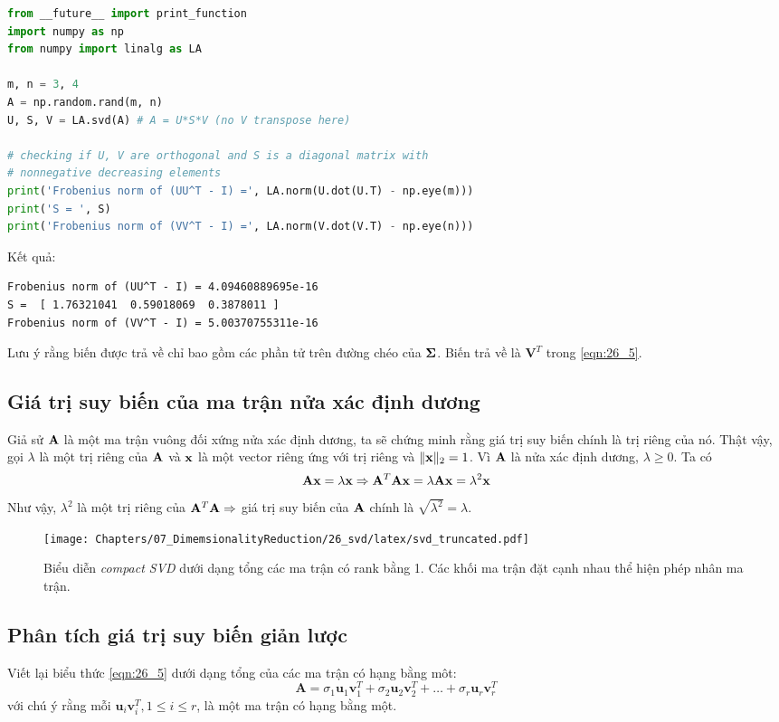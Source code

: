 \begin{lstlisting}[language=Python]
from __future__ import print_function
import numpy as np
from numpy import linalg as LA

m, n = 3, 4
A = np.random.rand(m, n)
U, S, V = LA.svd(A) # A = U*S*V (no V transpose here)

# checking if U, V are orthogonal and S is a diagonal matrix with
# nonnegative decreasing elements
print('Frobenius norm of (UU^T - I) =', LA.norm(U.dot(U.T) - np.eye(m)))
print('S = ', S)
print('Frobenius norm of (VV^T - I) =', LA.norm(V.dot(V.T) - np.eye(n)))
\end{lstlisting}
\newpage
Kết quả:
\begin{lstlisting}
Frobenius norm of (UU^T - I) = 4.09460889695e-16
S =  [ 1.76321041  0.59018069  0.3878011 ]
Frobenius norm of (VV^T - I) = 5.00370755311e-16
\end{lstlisting}

Lưu ý rằng biến  được trả về chỉ bao gồm các phần tử trên đường
chéo của $\mathbf{\Sigma}$. Biến  trả về là $\mathbf{V}^T$ trong
\eqref{eqn:26_5}.

\subsection{Giá trị suy biến của ma trận nửa xác định dương}
Giả sử $\mathbf{A}$ là một ma trận vuông đối xứng nửa xác định dương, ta sẽ chứng minh rằng giá trị suy biến  chính là trị riêng của nó. Thật vậy, gọi $\lambda$ là một trị riêng của $\mathbf{A}$ và $\mathbf{x}$ là một vector riêng ứng với trị riêng và $\|\mathbf{x}\|_2 = 1$. Vì $\mathbf{A}$ là nửa xác định dương, $\lambda \geq 0$.
Ta có
\begin{equation}
\mathbf{A}\mathbf{x} = \lambda\mathbf{x} \Rightarrow \mathbf{A}^T\mathbf{A}\mathbf{x} = \lambda\mathbf{A}\mathbf{x} = \lambda^2\mathbf{x}
\end{equation}
Như vậy, $\lambda^2$ là một trị riêng của $\mathbf{A}^T\mathbf{A} \Rightarrow$ giá trị suy biến của $\mathbf{A}$ chính là $\sqrt{\lambda^2} = \lambda$.

\begin{figure}[t]
\centering
\texttt{[image: Chapters/07\_DimemsionalityReduction/26\_svd/latex/svd\_truncated.pdf]}
\caption[]{Biểu diễn \textit{compact SVD} dưới dạng tổng
các ma trận có rank bằng 1. Các khối ma trận đặt cạnh nhau thể hiện phép
nhân ma trận.}
\label{fig:26_2}
\end{figure}


\subsection{Phân tích giá trị suy biến giản lược}
Viết lại biểu thức \eqref{eqn:26_5} dưới dạng tổng của các ma trận có hạng
bằng môt:
\begin{equation}
\mathbf{A} = \sigma_1 \mathbf{u}_1 \mathbf{v}^T_1 + \sigma_2\mathbf{u}_2\mathbf{v}_2^T + \dots + \sigma_r\mathbf{u}_r\mathbf{v}_r^T
\end{equation}
với chú ý rằng mỗi $\mathbf{u}_i\mathbf{v}^T_i, 1 \leq i \leq r$, là một ma trận có hạng bằng một.

